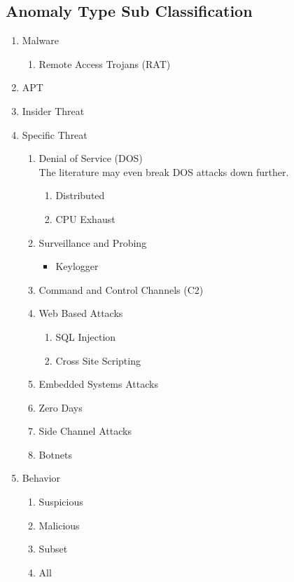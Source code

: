 \documentclass[10pt]{IEEEtran}
\begin{document}
\subsection{Anomaly Type Sub Classification}
\cite{hansman2005taxonomy} \cite{hansman2005taxonomy} 
\begin{enumerate}
    \item Malware\cite{gabriel2009analyzing}\cite{tankard2011advanced}
    \begin{enumerate}
        \item Remote Access Trojans (RAT)\cite{wu2017detecting}
    \end{enumerate}
    \item APT
    \item Insider Threat\cite{mukherjee1994network}
    \item Specific Threat
    \begin{enumerate}
        \item Denial of Service (DOS) \cite{zargar2013survey}\cite{warrender1999detecting}\cite{lee1999data}
        \\The literature may even break DOS attacks down further.
        \begin{enumerate} 
            \item Distributed
            \item CPU Exhaust
        \end{enumerate}
        \item Surveillance and Probing \cite{lazarevic2005intrusion}
        \begin{itemize}
            \item Keylogger
        \end{itemize}
        \item Command and Control Channels (C2) \cite{chen2014study}\cite{jasek2013apt}\cite{bhatt2014towards}
        \item Web Based Attacks
        \begin{enumerate}
            \item SQL Injection
            \item Cross Site Scripting
        \end{enumerate}
        \item Embedded Systems Attacks
        \item Zero Days \cite{kotenko2012common}\cite{chen2014study}\cite{jeun2012practical}
        \item Side Channel Attacks
        \item Botnets\cite{singh2014big}\cite{awad2017network}
    \end{enumerate}
    \item Behavior
        \begin{enumerate}
            \item Suspicious
            \item Malicious
            \item Subset
            \item All
        \end{enumerate}
\end{enumerate}
\end{document}
